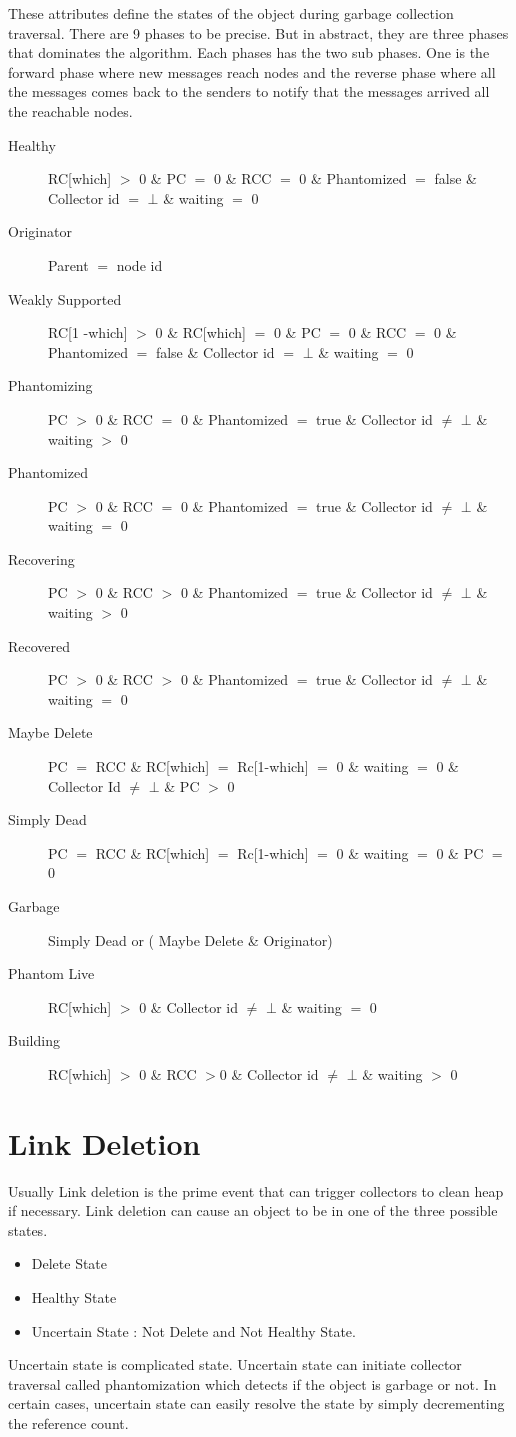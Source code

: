 \documentclass{article}
\begin{document}
These attributes define the states of the object during garbage collection traversal. There are 9 phases to be precise. But in abstract, they are three phases that dominates the algorithm. Each phases has the two sub phases. One is the forward phase where new messages reach nodes and the reverse phase where all the messages comes back to the senders to notify that the messages arrived all the reachable nodes. 
\begin{description}
  \item[Healthy] RC[which] $>$ 0 \& PC $=$ 0 \& RCC $=$ 0 \& Phantomized $=$ false \& Collector id $=$ $\bot$ \& waiting $=$ 0
  \item[Originator] Parent $=$ node id 
  \item[Weakly Supported] RC[1 -which] $>$ 0 \& RC[which] $=$ 0 \& PC $=$ 0 \& RCC $=$ 0 \& Phantomized $=$ false \& Collector id $=$ $\bot$ \& waiting $=$ 0
  \item[Phantomizing] PC $>$ 0 \& RCC $=$ 0 \& Phantomized $=$ true \& Collector id $\neq$ $\bot$ \& waiting $>$ 0
  \item[Phantomized] PC $>$ 0 \& RCC $=$ 0 \& Phantomized $=$ true \& Collector id $\neq$ $\bot$ \& waiting $=$ 0
   \item[Recovering] PC $>$ 0 \& RCC $>$ 0 \& Phantomized $=$ true \& Collector id $\neq$ $\bot$ \& waiting $>$ 0
   \item[Recovered] PC $>$ 0 \& RCC $>$ 0 \& Phantomized $=$ true \& Collector id $\neq$ $\bot$ \& waiting $=$ 0
  \item[Maybe Delete] PC $=$ RCC \& RC[which] $=$ Rc[1-which] $=$ 0 \& waiting $=$ 0 \& Collector Id $\neq$ $\bot$ \& PC $>$ 0
  	\item [Simply Dead] PC $=$ RCC \& RC[which] $=$ Rc[1-which] $=$ 0 \& waiting $=$ 0 \& PC $=$ 0 
  	\item [Garbage] Simply Dead or  ( Maybe Delete \& Originator)
  \item[Phantom Live] RC[which] $>$ 0 \& Collector id $\neq$ $\bot$ \& waiting $=$ 0
   \item[Building] RC[which] $>$ 0 \& RCC $>$0 \& Collector id $\neq$ $\bot$ \& waiting $>$ 0

\end{description}
\section{Link Deletion}
	Usually Link deletion is the prime event that can trigger collectors to clean heap if necessary. Link deletion can cause an object to be in one of the three possible states. 
\begin{itemize}
  \item Delete State
  \item Healthy State
  \item Uncertain State : Not Delete and Not Healthy State.
\end{itemize}
	Uncertain state is complicated state. Uncertain state can initiate collector traversal called phantomization which detects if the object is garbage or not. In certain cases, uncertain state can easily resolve the state by simply decrementing the reference count. 
\end{document}

